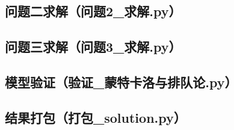 \documentclass[12pt,a4paper]{ctexart}
\begin{document}
\subsection{问题二求解（问题2\_求解.py）}

\subsection{问题三求解（问题3\_求解.py）}

\subsection{模型验证（验证\_蒙特卡洛与排队论.py）}

\subsection{结果打包（打包\_solution.py）}
\end{document}
